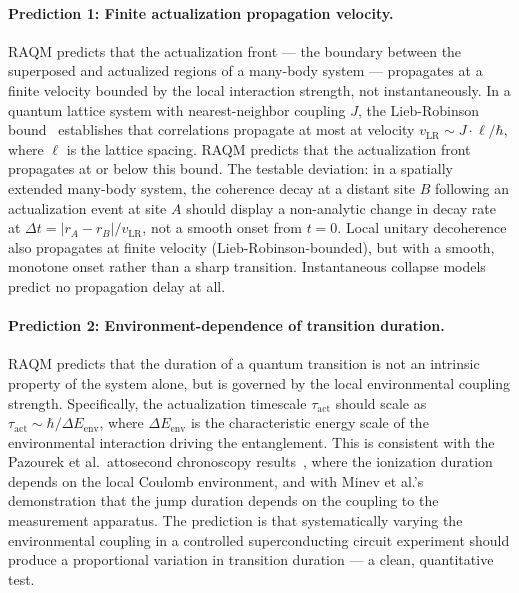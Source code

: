 \documentclass[11pt,a4paper]{article}
\theoremstyle{plain}
\theoremstyle{definition}
\theoremstyle{remark}
\begin{document}
\paragraph{Prediction 1: Finite actualization propagation velocity.}
RAQM predicts that the actualization front --- the boundary between the superposed
and actualized regions of a many-body system --- propagates at a finite velocity
bounded by the local interaction strength, not instantaneously. In a quantum
lattice system with nearest-neighbor coupling $J$, the Lieb-Robinson
bound~\citep{LiebRobinson1972} establishes that correlations propagate at most at
velocity $v_{\mathrm{LR}} \sim J \cdot \ell / \hbar$, where $\ell$ is the lattice
spacing. RAQM predicts that the actualization front propagates at or below this
bound. The testable deviation: in a spatially extended many-body system, the
coherence decay at a distant site $B$ following an actualization event at
site $A$ should display a non-analytic change in decay rate at
$\Delta t = |r_A - r_B| / v_{\mathrm{LR}}$, not a smooth onset from
$t = 0$. Local unitary decoherence also propagates at finite velocity
(Lieb-Robinson-bounded), but with a smooth, monotone onset rather than
a sharp transition. Instantaneous collapse models predict no propagation
delay at all.

\paragraph{Prediction 2: Environment-dependence of transition duration.}
RAQM predicts that the duration of a quantum transition is not an intrinsic
property of the system alone, but is governed by the local environmental coupling
strength. Specifically, the actualization timescale $\tau_{\mathrm{act}}$ should
scale as $\tau_{\mathrm{act}} \sim \hbar / \Delta E_{\mathrm{env}}$, where
$\Delta E_{\mathrm{env}}$ is the characteristic energy scale of the environmental
interaction driving the entanglement. This is consistent with the Pazourek et al.\
attosecond chronoscopy results~\citep{Pazourek2015}, where the ionization duration
depends on the local Coulomb environment, and with Minev et al.'s demonstration
that the jump duration depends on the coupling to the measurement apparatus. The
prediction is that systematically varying the environmental coupling in a controlled
superconducting circuit experiment should produce a proportional variation in
transition duration --- a clean, quantitative test.
\end{document}
